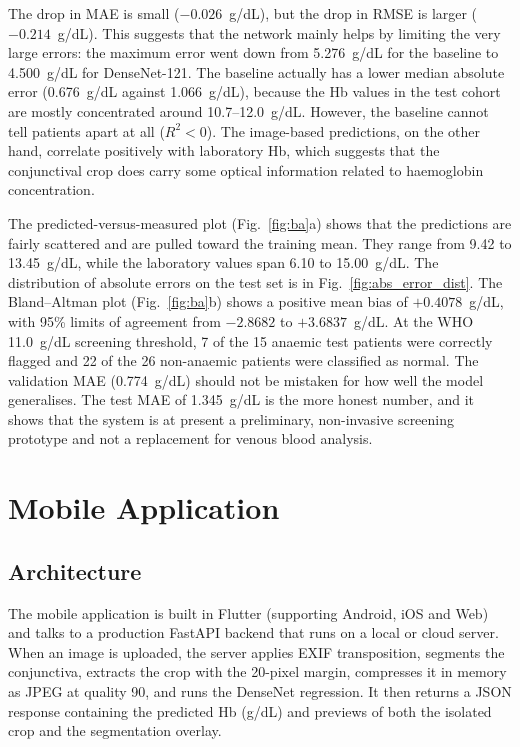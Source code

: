 \documentclass[conference]{IEEEtran}
\begin{document}
The drop in MAE is small ($-0.026$~g/dL), but the drop in RMSE is larger
($-0.214$~g/dL). This suggests that the network mainly helps by limiting the
very large errors: the maximum error went down from 5.276~g/dL for the baseline
to 4.500~g/dL for DenseNet-121. The baseline actually has a lower median
absolute error (0.676~g/dL against 1.066~g/dL), because the Hb values in the
test cohort are mostly concentrated around 10.7--12.0~g/dL. However, the
baseline cannot tell patients apart at all ($R^2 < 0$). The image-based
predictions, on the other hand, correlate positively with laboratory Hb, which suggests that the conjunctival crop does carry
some optical information related to haemoglobin concentration.

The predicted-versus-measured plot (Fig.~\ref{fig:ba}a) shows that the
predictions are fairly scattered and are pulled toward the training mean. They
range from 9.42 to 13.45~g/dL, while the laboratory values span 6.10 to
15.00~g/dL. The distribution of absolute errors
on the test set is in Fig.~\ref{fig:abs_error_dist}. The Bland--Altman plot
(Fig.~\ref{fig:ba}b) shows a positive mean bias of $+0.4078$~g/dL, with 95\% limits of agreement from $-2.8682$ to
$+3.6837$~g/dL. At the WHO 11.0~g/dL screening threshold, 7 of the 15 anaemic
test patients were correctly flagged and 22 of the 26 non-anaemic patients were
classified as normal. The validation MAE (0.774~g/dL) should not be mistaken for
how well the model generalises. The test MAE of 1.345~g/dL is the more honest
number, and it shows that the system is at present a preliminary, non-invasive
screening prototype and not a replacement for venous blood analysis.

\section{Mobile Application}
\subsection{Architecture}
The mobile application is built in Flutter (supporting Android, iOS and Web) and
talks to a production FastAPI backend that runs on a local or cloud server.
When an image is uploaded, the server applies EXIF transposition, segments the
conjunctiva, extracts the crop with the 20-pixel margin, compresses it in memory
as JPEG at quality 90, and runs the DenseNet regression. It then returns a JSON
response containing the predicted Hb (g/dL) and previews of both the isolated crop
and the segmentation overlay.
\end{document}
